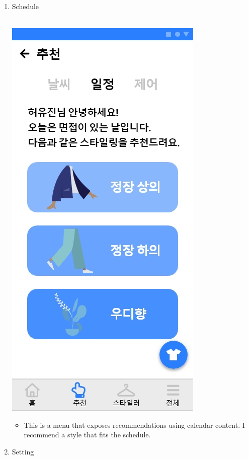\documentclass[conference]{IEEEtran}
\begin{document}
\begin{enumerate}
\begin{itemize}
\end{itemize}
      \item Schedule \\ \\
      \centerline{\includegraphics[scale=0.30]{9-2. 추천(일정).jpg}}
      \break
          \begin{itemize}
    \item[] This is a menu that exposes recommendations using calendar content. I recommend a style that fits the schedule.\\
\end{itemize}
       \item Setting \\ \\ \\

\end{enumerate}
\end{document}
